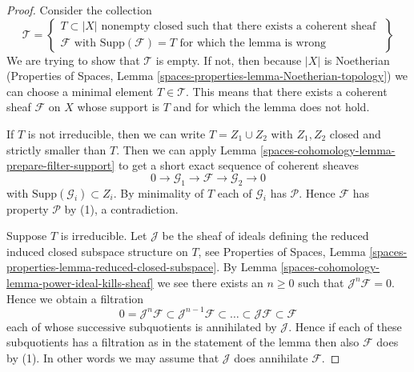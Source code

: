 \begin{proof}
Consider the collection
$$
\mathcal{T} =
\left\{
\begin{matrix}
T \subset |X|
\text{ nonempty closed such that there exists a coherent sheaf } \\
\mathcal{F}
\text{ with }
\text{Supp}(\mathcal{F}) = T
\text{ for which the lemma is wrong}
\end{matrix}
\right\}
$$
We are trying to show that $\mathcal{T}$ is empty. If not, then
because $|X|$ is Noetherian (Properties of Spaces, Lemma
\ref{spaces-properties-lemma-Noetherian-topology})
we can choose a minimal element $T \in \mathcal{T}$. This means that
there exists a coherent sheaf $\mathcal{F}$ on $X$ whose support is $T$
and for which the lemma does not hold.

\medskip\noindent
If $T$ is not irreducible, then we can write $T = Z_1 \cup Z_2$
with $Z_1, Z_2$ closed and strictly smaller than $T$.
Then we can apply Lemma \ref{spaces-cohomology-lemma-prepare-filter-support}
to get a short exact sequence of coherent sheaves
$$
0 \to
\mathcal{G}_1 \to
\mathcal{F} \to
\mathcal{G}_2 \to 0
$$
with $\text{Supp}(\mathcal{G}_i) \subset Z_i$. By minimality of
$T$ each of $\mathcal{G}_i$ has $\mathcal{P}$. Hence $\mathcal{F}$
has property $\mathcal{P}$ by (1), a contradiction.

\medskip\noindent
Suppose $T$ is irreducible. Let $\mathcal{J}$ be the sheaf of ideals
defining the reduced induced closed subspace structure on $T$,
see Properties of Spaces, Lemma
\ref{spaces-properties-lemma-reduced-closed-subspace}.
By Lemma \ref{spaces-cohomology-lemma-power-ideal-kills-sheaf} we see there exists
an $n \geq 0$ such that $\mathcal{J}^n\mathcal{F} = 0$. Hence we obtain
a filtration
$$
0 = \mathcal{J}^n\mathcal{F} \subset \mathcal{J}^{n - 1}\mathcal{F}
\subset \ldots \subset \mathcal{J}\mathcal{F} \subset \mathcal{F}
$$
each of whose successive subquotients is annihilated by $\mathcal{J}$.
Hence if each of these subquotients has a filtration as in the statement
of the lemma then also $\mathcal{F}$ does by (1). In other words we may
assume that $\mathcal{J}$ does annihilate $\mathcal{F}$.


\end{proof}
